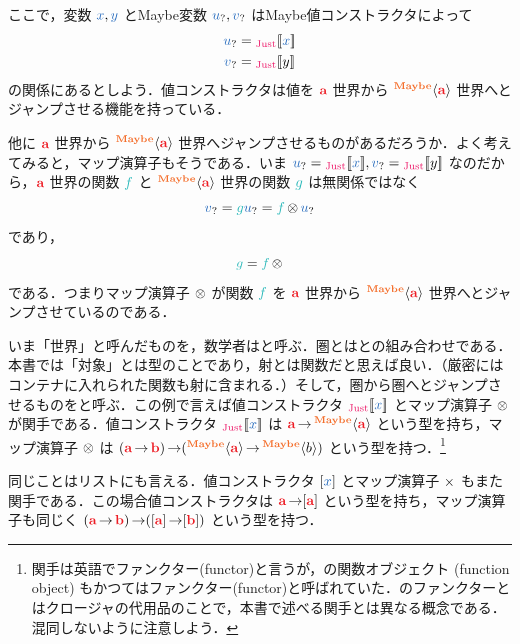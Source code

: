 \documentclass[a5paper,twoside,fleqn,draft]{jsbook}
\begin{document}
ここで，変数 $\hVar{x},\hVar{y}$ とMaybe変数 $\hMaybeVar{u},\hMaybeVar{v}$ はMaybe値コンストラクタによって
\begin{align}
  \hMaybeVar{u}
  &=\hJustWith{\hVar{x}}\\
  \hMaybeVar{v}
  &=\hJustWith{y}
\end{align}
の関係にあるとしよう．値コンストラクタは値を $\hTypeName{a}$ 世界から $\hMaybeConstruct{\hTypeName{a}}$ 世界へとジャンプさせる機能を持っている．

他に $\hTypeName{a}$ 世界から $\hMaybeConstruct{\hTypeName{a}}$ 世界へジャンプさせるものがあるだろうか．よく考えてみると，マップ演算子もそうである．いま $\hMaybeVar{u}=\hJustWith{\hVar{x}},\hMaybeVar{v}=\hJustWith{y}$ なのだから，$\hTypeName{a}$ 世界の関数 $\hFunc{f}$ と $\hMaybeConstruct{\hTypeName{a}}$ 世界の関数 $\hFunc{g}$ は無関係ではなく
\begin{equation}
  \hMaybeVar{v}
  =\hFunc{g}\hMaybeVar{u}
  =\hFunc{f}\hMaybeMap\hMaybeVar{u}
\end{equation}
であり，
\begin{equation}
  \hFunc{g}
  =\hFunc{f}\hMaybeMap
\end{equation}
である．つまりマップ演算子 $\operatorname{\otimes}$ が関数 $\hFunc{f}$ を $\hTypeName{a}$ 世界から $\hMaybeConstruct{\hTypeName{a}}$ 世界へとジャンプさせているのである．

いま「世界」と呼んだものを，数学者はと呼ぶ．圏とはとの組み合わせである．本書では「対象」とは型のことであり，射とは関数だと思えば良い．（厳密にはコンテナに入れられた関数も射に含まれる．）そして，圏から圏へとジャンプさせるものをと呼ぶ．この例で言えば値コンストラクタ $\hJustWith{\hVar{x}}$ とマップ演算子 $\operatorname{\otimes}$ が関手である．値コンストラクタ $\hJustWith{\hVar{x}}$ は $\hTypeName{a}\hFunctionArrow\hMaybeConstruct{\hTypeName{a}}$ という型を持ち，マップ演算子 $\operatorname{\otimes}$ は $(\hTypeName{a}\hFunctionArrow\hTypeName{b})\hFunctionArrow(\hMaybeConstruct{\hTypeName{a}}\hFunctionArrow\hMaybeConstruct{b})$ という型を持つ．\footnote{関手は英語でファンクター(functor)と言うが，\cxx の関数オブジェクト (function object) もかつてはファンクター(functor)と呼ばれていた．\cxx のファンクターとはクロージャの代用品のことで，本書で述べる関手とは異なる概念である．混同しないように注意しよう．}

同じことはリストにも言える．値コンストラクタ $[\hVar{x}]$ とマップ演算子 $\operatorname{\times}$ もまた関手である．この場合値コンストラクタは $\hTypeName{a}\hFunctionArrow\hListConstruct{\hTypeName{a}}$ という型を持ち，マップ演算子も同じく $(\hTypeName{a}\hFunctionArrow\hTypeName{b})\hFunctionArrow(\hListConstruct{\hTypeName{a}}\hFunctionArrow[\hTypeName{b}])$ という型を持つ．
\end{document}

